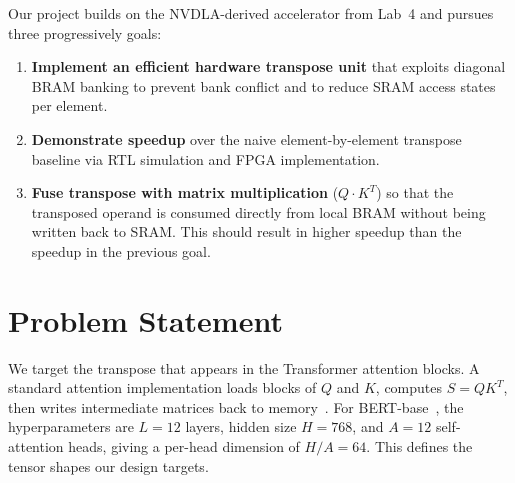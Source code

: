\documentclass[11pt]{article}
\begin{document}
Our project builds on the NVDLA-derived accelerator from Lab~4 and pursues three progressively goals:

\begin{enumerate}[nosep]
  \item \textbf{Implement an efficient hardware transpose unit} that exploits diagonal BRAM banking to prevent bank conflict and to reduce SRAM access states per element.
  \item \textbf{Demonstrate speedup} over the naive element-by-element transpose baseline via RTL simulation and FPGA implementation.
  \item \textbf{Fuse transpose with matrix multiplication} ($Q\!\cdot\!K^T$) so that the transposed operand is consumed directly from local BRAM without being written back to SRAM. This should result in higher speedup than the speedup in the previous goal.
\end{enumerate}

\section{Problem Statement}

We target the transpose that appears in the Transformer attention blocks. A standard attention implementation loads blocks of $Q$ and $K$,
computes $S = QK^T$, then writes intermediate matrices back to
memory~\cite{flashattn}. For BERT-base~\cite{bert}, the hyperparameters are $L = 12$ layers, hidden size $H = 768$, and $A = 12$ self-attention heads, giving a per-head dimension of $H/A = 64$. This defines the tensor shapes our design targets.
\end{document}
